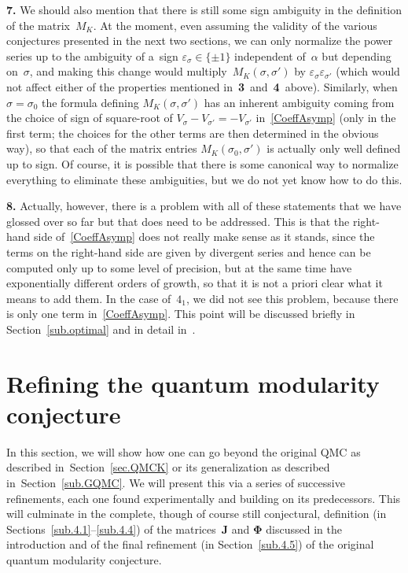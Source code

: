 \documentclass[pdftex]{sigma}
\numberwithin{equation}{section}
\def\a{\alpha}
\def\a{\alpha}
\def\s{\sigma}
\def\ve{\varepsilon}
\def\bJ{J} \def\bJ{\mathbf{J}}
\def\bPhi{\mathbf\Phi}
\begin{document}
{\bf 7.}
We should also mention that there is still some sign ambiguity in the definition
of the matrix~$M_K$. At the moment, even assuming the validity of the various
conjectures presented in the next two sections, we can only normalize the power
series \smash{$\Phi_\s^{(\s)}(h)$} up to the ambiguity of a~sign $\ve_\s\in\{\pm1\}$ independent
of~$\a$ but depending on~$\s$, and making this change would multiply~$M_K(\s,\s')$ by
$\ve_\s\ve_{\s'}$ (which would not affect either of the properties mentioned in~{\bf 3}~and~{\bf 4}~above). Similarly, when $\s=\s_0$ the formula defining $M_K(\s,\s')$ has
an inherent ambiguity coming from the choice of sign of square-root of
$V_\s-V_{\s'}=-V_{\s'}$ in~\eqref{CoeffAsymp} (only in the first term; the choices
for the other terms are then determined in the obvious way), so that each of the
matrix entries $M_K(\s_0,\s')$ is actually only well defined up to sign. Of course,
it is possible that there is some canonical way to normalize everything to eliminate
these ambiguities, but we do not yet know how to do this.

{\bf 8.}
Actually, however, there is a problem with all of these statements that we
have glossed over so far but that does need to be addressed. This is that the
right-hand side of~\eqref{CoeffAsymp} does not really make sense as it stands,
since the terms on the right-hand side are given by divergent series and hence
can be computed only up to some level of precision, but at the same time have
exponentially different orders of growth, so that it is not a priori clear what
it means to add them. In the case of~$4_1$, we did not see this problem, because
there is only one term in~\eqref{CoeffAsymp}. This point will be discussed
briefly in Section~\ref{sub.optimal} and in detail in~\cite{GZ:optimal}.

\section{Refining the quantum modularity conjecture}
\label{sec.RQMC}


In this section, we will show how one can go beyond the original QMC
as described in~Section~\ref{sec.QMCK} or its generalization as described
in~Section~\ref{sub.GQMC}. We will present this via a series of successive
refinements, each one found experimentally and building on its predecessors.
This will culminate in the complete, though of course still conjectural, definition
(in Sections~\ref{sub.4.1}--\ref{sub.4.4}) of the matrices~$\bJ$ and $\bPhi$
discussed in the introduction and of the final refinement (in Section~\ref{sub.4.5})
of the original quantum modularity conjecture.
\end{document}
